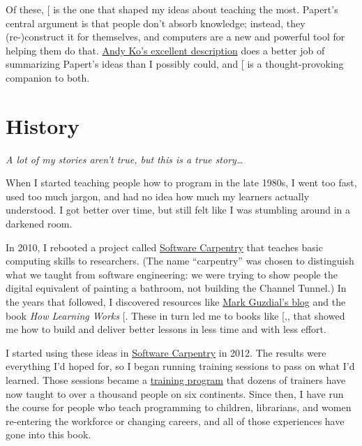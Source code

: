 Of these, {[}\protect[\hyperlink{b:Pape1993}{Pape1993}]{]} is the one that shaped my ideas about
teaching the most. Papert's central argument is that people don't
absorb knowledge; instead, they (re-)construct it for themselves, and
computers are a new and powerful tool for helping them do that. \href{https://medium.com/bits-and-behavior/mindstorms-what-did-papert-argue-and-what-does-it-mean-for-learning-and-education-c8324b58aca4}{Andy
Ko's excellent description} does a better job of
summarizing Papert's ideas than I possibly could, and
{[}\protect[\hyperlink{b:Craw2010}{Craw2010}]{]} is a thought-provoking companion to both.

\section{History}\label{s:intro-history}

\emph{A lot of my stories aren't true, but this is a true
story\ldots{}}

When I started teaching people how to program in the late 1980s, I went
too fast, used too much jargon, and had no idea how much my learners
actually understood. I got better over time, but still felt like I was
stumbling around in a darkened room.

In 2010, I rebooted a project called \href{http://software-carpentry.org}{Software Carpentry} that
teaches basic computing skills to researchers. (The name ``carpentry''
was chosen to distinguish what we taught from software engineering: we
were trying to show people the digital equivalent of painting a
bathroom, not building the Channel Tunnel.) In the years that
followed, I discovered resources like \href{http://computinged.wordpress.com}{Mark Guzdial's
blog} and the book \emph{How Learning Works}
{[}\protect[\hyperlink{b:Ambr2010}{Ambr2010}]{]}. These in turn led me to books like
{[},,\protect[\hyperlink{b:Lang2016}{Lang2016}]{]} that showed me
how to build and deliver better lessons in less time and with less
effort.

I started using these ideas in \href{http://software-carpentry.org}{Software Carpentry} in 2012. The
results were everything I'd hoped for, so I began running training
sessions to pass on what I'd learned. Those sessions became a
\href{http://carpentries.github.io/instructor-training/}{training program} that dozens of trainers have
now taught to over a thousand people on six continents. Since then, I
have run the course for people who teach programming to children,
librarians, and women re-entering the workforce or changing careers,
and all of those experiences have gone into this book.

